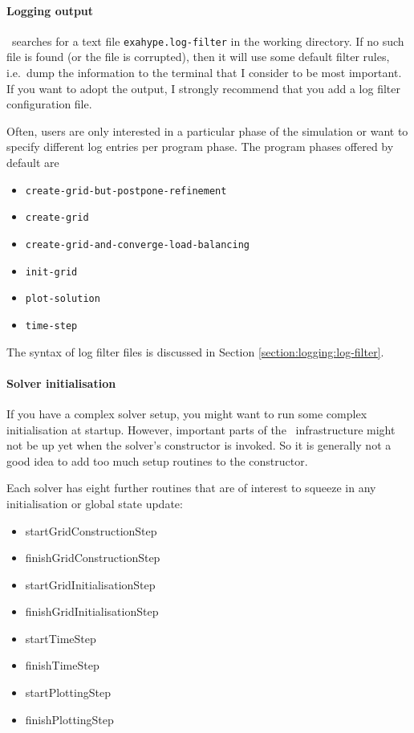 \paragraph{Logging output}

\ExaHyPE\ searches for a text file \texttt{exahype.log-filter} in the working
directory.
If no such file is found (or the file is corrupted), then it will use some
default filter rules, i.e.~dump the information to the terminal that I consider
to be most important.
If you want to adopt the output, I strongly recommend that you add a log filter
configuration file. 


Often, users are only interested in a particular phase of the simulation or want 
to specify different log entries per program phase. The program phases offered
by default are
\begin{itemize}
  \item \texttt{create-grid-but-postpone-refinement}
  \item \texttt{create-grid}
  \item \texttt{create-grid-and-converge-load-balancing}
  \item \texttt{init-grid}
  \item \texttt{plot-solution}
  \item \texttt{time-step}
\end{itemize}

\noindent
The syntax of log filter files is discussed in Section
\ref{section:logging:log-filter}.


\paragraph{Solver initialisation}

If you have a complex solver setup, you might want to run some complex
initialisation at startup.
However, important parts of the \ExaHyPE\ infrastructure might not be up yet
when the solver's constructor is invoked.
So it is generally not a good idea to add too much setup routines to the
constructor.


Each solver has eight further routines that are of interest to squeeze in any
initialisation or global state update:

\begin{itemize}
  \item startGridConstructionStep
  \item finishGridConstructionStep
  \item startGridInitialisationStep
  \item finishGridInitialisationStep
  \item startTimeStep
  \item finishTimeStep
  \item startPlottingStep
  \item finishPlottingStep   
\end{itemize}



